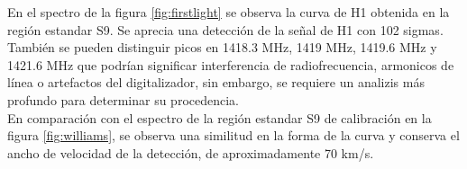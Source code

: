 En el spectro de la figura \ref{fig:firstlight} se observa la curva de H1 obtenida en la región estandar S9. Se aprecia una detección de la señal de H1 con 102 sigmas. También se pueden distinguir picos en 1418.3 MHz, 1419 MHz, 1419.6 MHz y 1421.6 MHz que podrían significar interferencia de radiofrecuencia, armonicos de línea o artefactos del digitalizador, sin embargo, se requiere un analizis más profundo para determinar su procedencia.\\

En comparación con el espectro de la región estandar S9 de calibración en la figura \ref{fig:williams}, se observa una similitud en la forma de la curva y conserva el ancho de velocidad de la detección, de aproximadamente 70 km/s.\\